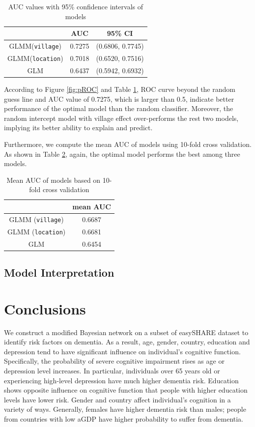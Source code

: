 \documentclass[11pt,twoside]{article}
\numberwithin{Theorem}{section}
\numberwithin{Definition}{section}
\numberwithin{Lemma}{section}
\numberwithin{Algorithm}{section}
\numberwithin{equation}{section}
\begin{document}
\begin{table}[!h]
	\centering
	\begin{tabular}{|c|c|c|}
		\hline
		 & AUC & 95\% CI \\
		\hline
		GLMM(\texttt{village}) & 0.7275 & (0.6806, 0.7745) \\
		GLMM(\texttt{location}) & 0.7018 & (0.6520, 0.7516) \\
		GLM & 0.6437 & (0.5942, 0.6932) \\
		\hline	
	\end{tabular}
	\caption{AUC values with 95\% confidence intervals of models}
	\label{tab:AUC}
\end{table}

According to Figure \ref{fig:pROC} and Table \ref{tab:AUC}, ROC curve beyond the random guess line and AUC value of 0.7275, which is larger than 0.5, indicate better performance of the optimal model than the random classifier. Moreover, the random intercept model with village effect over-performs the rest two models, implying its better ability to explain and predict. 

Furthermore, we compute the mean AUC of models using 10-fold cross validation. As shown in Table \ref{tab:meanAUC}, again, the optimal model performs the best among three models.

\begin{table}[!h]
	\centering
	\begin{tabular}{|c|c|}
		\hline
		 & mean AUC \\
		\hline
		GLMM (\texttt{village}) & 0.6687 \\
		GLMM (\texttt{location}) & 0.6681 \\
		GLM & 0.6454 \\
		\hline
	\end{tabular}
	\caption{Mean AUC of models based on 10-fold cross validation}
	\label{tab:meanAUC}
\end{table}

\subsection{Model Interpretation}

\clearpage

\section{Conclusions}

We construct a modified Bayesian network on a subset of easySHARE dataset to identify risk factors on dementia. As a result, age, gender, country, education and depression tend to have significant influence on individual's cognitive function. Specifically, the probability of severe cognitive impairment rises as age or depression level increases. In particular, individuals over 65 years old or experiencing high-level depression have much higher dementia risk. Education shows opposite influence on cognitive function that people with higher education levels have lower risk. Gender and country affect individual's cognition in a variety of ways. Generally, females have higher dementia risk than males; people from countries with low aGDP have higher probability to suffer from dementia.
\end{document}
